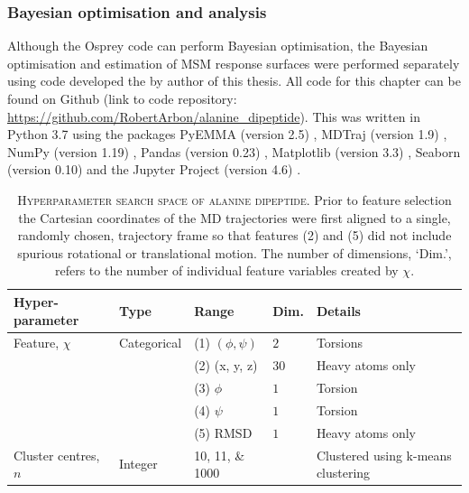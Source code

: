 \subsubsection*{Bayesian optimisation and analysis}
Although the Osprey code can perform Bayesian optimisation, the Bayesian optimisation and estimation of MSM response surfaces were performed separately using code developed the by author of this thesis. All code for this chapter can be found on Github (link to code repository: \href{https://github.com/RobertArbon/alanine_dipeptide/tree/fbe3ac7259e4da5cab15a60bffa9725b0b322bfd}{\color{blue}https://github.com/RobertArbon/alanine\_dipeptide}). This was written in Python 3.7 using the packages PyEMMA (version 2.5) \cite{schererPyEMMASoftwarePackage2015a}, MDTraj (version 1.9) \cite{mcgibbonMDTrajModernOpen2015}, NumPy (version 1.19) \cite{waltNumPyArrayStructure2011}, Pandas (version 0.23) \cite{mckinneyPandasFoundationalPython2011}, Matplotlib (version 3.3) \cite{hunterMatplotlib2DGraphics2007},  Seaborn (version 0.10) \cite{michaelwaskomMwaskomSeabornV02020} and the Jupyter Project (version 4.6) \cite{kluyverJupyterNotebooksPublishing2016}.

\begin{table}
    \caption[Hyperparameter search space of alanine dipeptide]{\textsc{Hyperparameter search space of alanine dipeptide}. Prior to feature selection the Cartesian coordinates of the MD trajectories were first aligned to a single, randomly chosen, trajectory frame so that features (2) and (5) did not include spurious rotational or translational motion.  The number of dimensions, `Dim.', refers to the number of individual feature variables created by $\chi$.}
    \centering
    \begin{tabularx}{0.9\textwidth}{ >{\raggedright\arraybackslash}X lll >{\raggedright\arraybackslash}X } 
    \hline
    \textbf{Hyper-parameter} & \textbf{Type} & \textbf{Range} &\textbf{Dim.} & \textbf{Details} \\
     \hline\hline
    Feature, $\chi$ & Categorical & (1) $(\phi, \psi)$ & $2$ & Torsions \\
    & & (2) (x, y, z) & $30$ & Heavy atoms only  \\
    & & (3) $\phi$ & $1$ & Torsion \\ 
    & & (4) $\psi$ & $1$ & Torsion \\ 
    & & (5) RMSD & $1$ & Heavy atoms only\\ 
    \hline 
    Cluster centres, $n$ & Integer & \numlist[list-final-separator = { ... }]{10;11;1000} & & Clustered using k-means clustering \\
     \hline
    \end{tabularx}
    \label{tab:ala2searchspace}
\end{table}

